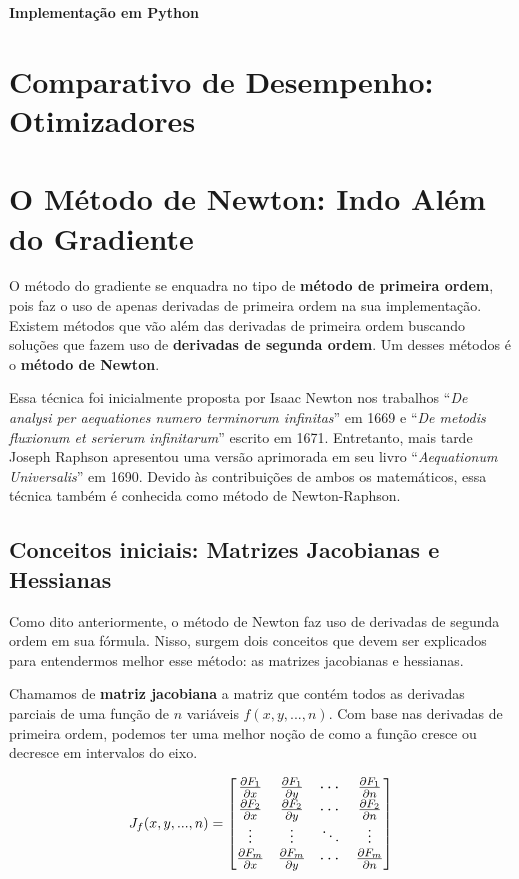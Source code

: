 \textbf{Implementação em Python}

\section{Comparativo de Desempenho: Otimizadores}


\section{O Método de Newton: Indo Além do Gradiente}

O método do gradiente se enquadra no tipo de \textbf{método de primeira ordem}, pois faz o uso de apenas derivadas de primeira ordem na sua implementação. Existem métodos que vão além das derivadas de primeira ordem buscando soluções que fazem uso de \textbf{derivadas de segunda ordem}. Um desses métodos é o \textbf{método de Newton}.

Essa técnica foi inicialmente proposta por Isaac Newton nos trabalhos “\textit{De analysi per aequationes numero terminorum infinitas}” em 1669 e “\textit{De metodis fluxionum et serierum infinitarum}” escrito em 1671. Entretanto, mais tarde Joseph Raphson apresentou uma versão aprimorada em seu livro “\textit{Aequationum Universalis}” em 1690. Devido às contribuições de ambos os matemáticos, essa técnica também é conhecida como método de Newton-Raphson.

\subsection{Conceitos iniciais: Matrizes Jacobianas e Hessianas}

Como dito anteriormente, o método de Newton faz uso de derivadas de segunda ordem em sua fórmula. Nisso, surgem dois conceitos que devem ser explicados para entendermos melhor esse método: as matrizes jacobianas e hessianas.

Chamamos de \textbf{matriz jacobiana} a matriz que contém todos as derivadas parciais de uma função de $n$ variáveis $f(x, y, ..., n)$. Com base nas derivadas de primeira ordem, podemos ter uma melhor noção de como a função cresce ou decresce em intervalos do eixo.

    \begin{equation}
        \large J_f(x,y,...,n) =
        \begin{bmatrix}
        \frac{\partial F_1}{\partial x} & \frac{\partial F_1}{\partial y} & \cdots & \frac{\partial F_1}{\partial n} \\
        \frac{\partial F_2}{\partial x} & \frac{\partial F_2}{\partial y} & \cdots & \frac{\partial F_2}{\partial n} \\
        \vdots & \vdots & \ddots & \vdots \\
        \frac{\partial F_m}{\partial x} & \frac{\partial F_m}{\partial y} & \cdots & \frac{\partial F_m}{\partial n}
        \end{bmatrix}
    \end{equation}

